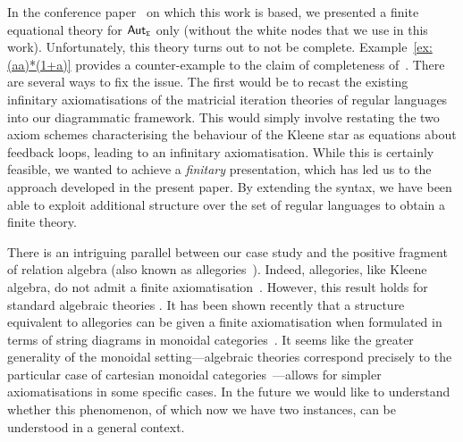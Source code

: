 \documentclass{lmcs}
\theoremstyle{plain}\newtheorem{satz}[thm]{Satz} %
\begin{document}
In the conference paper~\cite{piedeleu2021string} on which this work is based, we presented a finite equational theory for $\mathsf{Aut_{\scriptscriptstyle{\Sigma}}}$ only (without the white nodes that we use in this work). Unfortunately, this theory turns out to not be complete. Example~\ref{ex:(aa)*(1+a)} provides a counter-example to the claim of completeness of~\cite{piedeleu2021string}. There are several ways to fix the issue. The first would be to recast the existing infinitary axiomatisations of the matricial iteration theories of regular languages~\cite{bloom1993equational} into our diagrammatic framework. This would simply involve restating the two axiom schemes characterising the behaviour of the Kleene star as equations about feedback loops, leading to an infinitary axiomatisation. While this is certainly feasible, we wanted to achieve a \emph{finitary} presentation, which has led us to the approach developed in the present paper. By extending the syntax, we have been able to exploit additional structure over the set of regular languages to obtain a finite theory.



There is an intriguing parallel between our case study and the positive fragment of relation algebra (also known as allegories~\cite{freyd1990categories}). Indeed, allegories, like Kleene algebra, do not admit a finite axiomatisation~\cite{freyd1990categories}. However, this result holds for standard algebraic theories%
. It has been shown recently that a structure equivalent to allegories can be given a finite axiomatisation when formulated in terms of string diagrams in monoidal categories~\cite{bonchi2018graphical}. It seems like the greater generality of the monoidal setting---algebraic theories correspond precisely to the particular case of cartesian monoidal categories~\cite{bonchi2018deconstructing}---allows for simpler axiomatisations in some specific cases. In the future we would like to understand whether this phenomenon, of which now we have two instances, can be understood in a general context.
\end{document}
